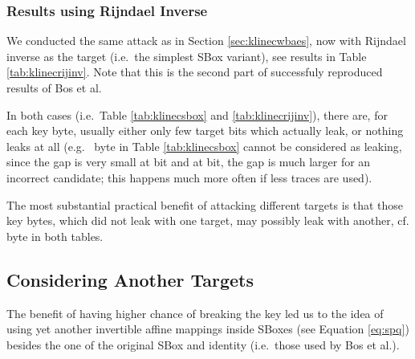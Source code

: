 \subsubsection{Results using Rijndael Inverse}
	
	We conducted the same attack as in Section \ref{sec:klinecwbaes}, now with Rijndael inverse as the target (i.e.\ the simplest SBox variant), see results in Table \ref{tab:klinecrijinv}. Note that this is the second part of successfuly reproduced results of Bos et al.
	
	
	In both cases (i.e.\ Table \ref{tab:klinecsbox} and \ref{tab:klinecrijinv}), there are, for each key byte, usually either only few target bits which actually leak, or nothing leaks at all (e.g.\  byte in Table \ref{tab:klinecsbox} cannot be considered as leaking, since the gap is very small at  bit and at  bit, the gap is much larger for an incorrect candidate; this happens much more often if less traces are used).
	
	The most substantial practical benefit of attacking different targets is that those key bytes, which did not leak with one target, may possibly leak with another, cf.  byte in both tables.



\subsection{Considering Another Targets}
\label{sec:16targets}

The benefit of having higher chance of breaking the key led us to the idea of using yet another invertible affine mappings inside SBoxes (see Equation \ref{eq:spq}) besides the one of the original SBox and identity (i.e.\ those used by Bos et al.).

